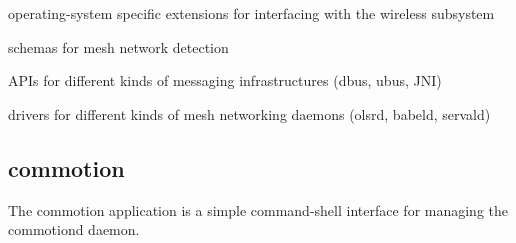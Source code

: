 \begin{DoxyItemize}
\item operating-\/system specific extensions for interfacing with the wireless subsystem
\item schemas for mesh network detection
\item A\+P\+Is for different kinds of messaging infrastructures (dbus, ubus, J\+N\+I)
\item drivers for different kinds of mesh networking daemons (olsrd, babeld, servald)
\end{DoxyItemize}

\subsection*{commotion }

The commotion application is a simple command-\/shell interface for managing the commotiond daemon. 